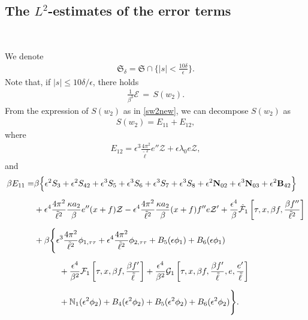 \documentclass[10pt, reqno]{amsart}
\numberwithin{equation}{section}
\theoremstyle{definition}
\begin{document}
{{\subsection{ The $L^2$-estimates of the error terms}\label{Section6.3}\

We denote
\begin{align*}
\mathfrak S_\delta = \mathfrak S \cap \Big\{ |s| < \frac {10\delta}\epsilon \Big\}.
\end{align*}
Note that, if $|s|\leq {10\delta}/\epsilon$, there holds
\begin{align*}
 \frac{1}{\beta^3} {{\mathcal E}} \,=\, S(w_2).
\end{align*}
From the expression of $S(w_2)$ as in \eqref{sw2new}, we can decompose $S(w_2)$ as
\begin{align}\label{E11+E12}
S(w_2) = E_{11} + E_{12},
\end{align}
where
\begin{align} \label{E12}
 E_{12} = \epsilon^3\frac{4\pi^2}{{\tilde\ell}^2} e''\mathcal Z+ \epsilon\lambda_0 e{\mathcal Z},
\end{align}
and
\begin{align}\label{E11}
\beta E_{11} =&
\beta \Big\{\epsilon^2 S_{3} + \epsilon^2 S_{42} + \epsilon^3 S_{5} +\epsilon^3 S_{6}
 +\epsilon^3 S_{7} +\epsilon^3 S_{8}
 +\epsilon^2 {\bf N}_{02}
  +\epsilon^3 {\bf N}_{03}
 + \epsilon^2 {\bf B}_{42}\Big\}
\nonumber\\[2mm]
&
 +\epsilon^4 \frac{4\pi^2} {{\tilde\ell}^2} \frac{\kappa a_2}{\, \beta\, } e'' (x+f)\mathcal Z -\epsilon^4 \frac{ 4\pi^2} {{\tilde\ell}^2} \frac{\kappa a_2 }{\, \beta\, } (x+f) f'' e \mathcal Z' + \frac{\epsilon^4}{\beta} \hat{\mathcal F}_1\left[\tau, x, \beta f, \frac{\beta f''}{\tilde\ell^2} \right]
\nonumber\\[2mm]
&
 +\beta\Bigg\{ \epsilon^3 \frac{4\pi^2}{{\tilde\ell}^2} {\phi}_{1, \tau\tau}
+ \epsilon^4 \frac{4\pi^2}{{\tilde\ell}^2}\phi_{2, \tau\tau}
+B_{5}(\epsilon\phi_1)+B_{6}(\epsilon\phi_1)
\nonumber\\[2mm]
&
\qquad\quad
+ \frac{\epsilon^4}{\beta^2} \mathcal F_1\left[\tau, x, \beta f, \frac{\beta f'}{\tilde\ell}\right]
 +\frac{\epsilon^4} {\beta^2} \mathcal G_1\left[\tau, x, \beta f, \frac{\beta f'}{\tilde\ell}, e, \frac{e'}{\tilde\ell}\right]
\nonumber\\[2mm]
&\qquad\quad
+ \mathbb{N}_1 (\epsilon^2 \phi_2)
+ B_4(\epsilon^2\phi_2)+ B_5 (\epsilon^2{\phi_2})+ B_6 (\epsilon^2{\phi_2})\Bigg\}.
\end{align}

}}
\end{document}
